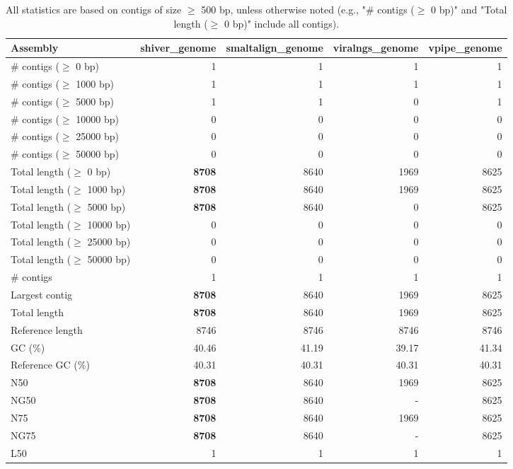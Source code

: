 \documentclass[12pt,a4paper]{article}
\begin{document}
\begin{table}[ht]
\begin{center}
\caption{All statistics are based on contigs of size $\geq$ 500 bp, unless otherwise noted (e.g., "\# contigs ($\geq$ 0 bp)" and "Total length ($\geq$ 0 bp)" include all contigs).}
\begin{tabular}{|l*{4}{|r}|}
\hline
Assembly & shiver\_genome & smaltalign\_genome & viralngs\_genome & vpipe\_genome \\ \hline
\# contigs ($\geq$ 0 bp) & 1 & 1 & 1 & 1 \\ \hline
\# contigs ($\geq$ 1000 bp) & 1 & 1 & 1 & 1 \\ \hline
\# contigs ($\geq$ 5000 bp) & 1 & 1 & 0 & 1 \\ \hline
\# contigs ($\geq$ 10000 bp) & 0 & 0 & 0 & 0 \\ \hline
\# contigs ($\geq$ 25000 bp) & 0 & 0 & 0 & 0 \\ \hline
\# contigs ($\geq$ 50000 bp) & 0 & 0 & 0 & 0 \\ \hline
Total length ($\geq$ 0 bp) & {\bf 8708} & 8640 & 1969 & 8625 \\ \hline
Total length ($\geq$ 1000 bp) & {\bf 8708} & 8640 & 1969 & 8625 \\ \hline
Total length ($\geq$ 5000 bp) & {\bf 8708} & 8640 & 0 & 8625 \\ \hline
Total length ($\geq$ 10000 bp) & 0 & 0 & 0 & 0 \\ \hline
Total length ($\geq$ 25000 bp) & 0 & 0 & 0 & 0 \\ \hline
Total length ($\geq$ 50000 bp) & 0 & 0 & 0 & 0 \\ \hline
\# contigs & 1 & 1 & 1 & 1 \\ \hline
Largest contig & {\bf 8708} & 8640 & 1969 & 8625 \\ \hline
Total length & {\bf 8708} & 8640 & 1969 & 8625 \\ \hline
Reference length & 8746 & 8746 & 8746 & 8746 \\ \hline
GC (\%) & 40.46 & 41.19 & 39.17 & 41.34 \\ \hline
Reference GC (\%) & 40.31 & 40.31 & 40.31 & 40.31 \\ \hline
N50 & {\bf 8708} & 8640 & 1969 & 8625 \\ \hline
NG50 & {\bf 8708} & 8640 & - & 8625 \\ \hline
N75 & {\bf 8708} & 8640 & 1969 & 8625 \\ \hline
NG75 & {\bf 8708} & 8640 & - & 8625 \\ \hline
L50 & 1 & 1 & 1 & 1 \\ \hline

\end{tabular}
\end{center}
\end{table}
\end{document}
